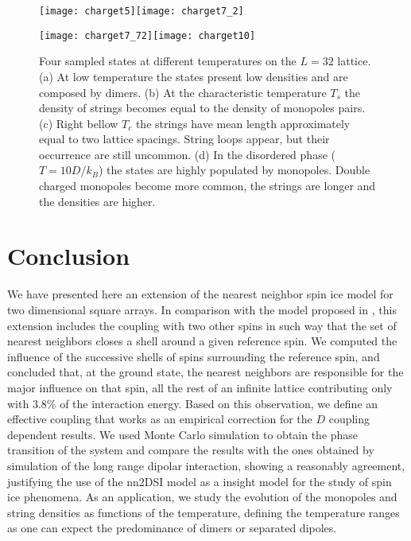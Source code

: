 \documentclass[aps,showkeys,groupedaddress]{revtex4}
\begin{document}
\begin{figure}[ht]
\begin{center}
\texttt{[image: charget5]}\texttt{[image: charget7\_2]}

\texttt{[image: charget7\_72]}\texttt{[image: charget10]}
\end{center}
\caption{Four sampled states at different temperatures on the $L=32$ lattice. (a) At low temperature the states present low densities and are composed by dimers. (b) At the characteristic temperature $T_s$ the density of strings becomes equal to the density of monopoles pairs. (c) Right bellow $T_c$ the strings have mean length approximately equal to two lattice spacings. String loops appear, but their occurrence are still uncommon. (d) In the disordered phase ($T=10 D/k_B$) the states are highly populated by monopoles. Double charged monopoles become more common, the strings are longer and the densities are higher.}
\label{figCharges}
\end{figure}


\section{Conclusion} \label{conclusions}

We have presented here an extension of the nearest neighbor spin ice model for two dimensional square arrays. In comparison with the model proposed in \cite{Xie2015}, this extension includes the coupling with two other spins in such way that the set of nearest neighbors closes a shell around a given reference spin. We computed the influence of the successive shells of spins surrounding the reference spin, and concluded that, at the ground state, the nearest neighbors are responsible for the major influence on that spin, all the rest of an infinite lattice contributing only with $3.8\%$ of the interaction energy. Based on this observation, we define an effective coupling that works as an empirical correction for the $D$ coupling dependent results. We used Monte Carlo simulation to obtain the phase transition of the system and compare the results with the ones obtained by simulation of the long range dipolar interaction, showing a reasonably agreement, justifying the use of the nn2DSI model as a insight model for the study of spin ice phenomena. As an application, we study the evolution of the monopoles and string densities as functions of the temperature, defining the temperature ranges as one can expect the predominance of dimers or separated dipoles.
\end{document}
